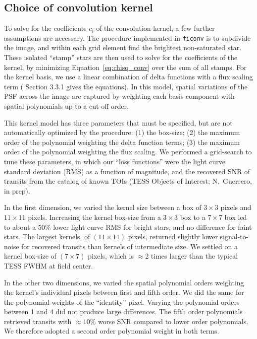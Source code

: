 \documentclass[12pt,twocolumn,tighten]{aastex62}
\begin{document}
\subsection{Choice of convolution kernel}
\label{subsec:tuneconvkernel}

To solve for the coefficients $c_i$ of the convolution kernel, a few
further assumptions are necessary.  The procedure implemented in
\texttt{ficonv} is to subdivide the image, and within each grid
element find the brightest non-saturated star. These isolated
``stamp'' stars are then used to solve for the coefficients of the
kernel, by minimizing Equation~\ref{eq:chisq_conv} over the sum of all
stamps.  For the kernel basis, we use a linear combination of delta
functions with a flux scaling term
(\citealt{soares-furtado_image_2017} Section 3.3.1 gives the
equations).  In this model, spatial variations of the PSF across the
image are captured by weighting each basis component with spatial
polynomials up to a cut-off order.

This kernel model has three parameters that must be specified, but are
not automatically optimized by the procedure: (1) the box-size; (2)
the maximum order of the polynomial weighting the delta function
terms; (3) the maximum order of the polynomial weighting the flux
scaling.  We performed a grid-search to tune these parameters, in
which our ``loss functions'' were the light curve standard deviation
(RMS) as a function of magnitude, and the recovered SNR of transits
from the catalog of known TOIs (TESS Objects of Interest; N.~Guerrero,
in prep).

In the first dimension, we varied the kernel size between a box of
$3\times3$ pixels and $11\times11$ pixels.  Increasing the kernel
box-size from a $3\times3$ box to a $7\times7$ box led to about a 50\%
lower light curve RMS for bright stars, and no difference for faint
stars.  The largest kernels, of $(11\times11)$ pixels, returned
slightly lower signal-to-noise for recovered transits than kernels of
intermediate size.  We settled on a kernel box-size of $(7\times7)$
pixels, which is $\approx$2 times larger than the typical TESS FWHM at
field center. 

In the other two dimensions, we varied the spatial polynomial orders
weighting the kernel's individual pixels between first and fifth
order.  We did the same for the polynomial weights of the ``identity''
pixel.  Varying the polynomial orders between 1 and 4 did not produce
large differences.  The fifth order polynomials retrieved transits
with $\approx10\%$ worse SNR compared to lower order polynomials.  We
therefore adopted a second order polynomial weight in both terms.
\end{document}
